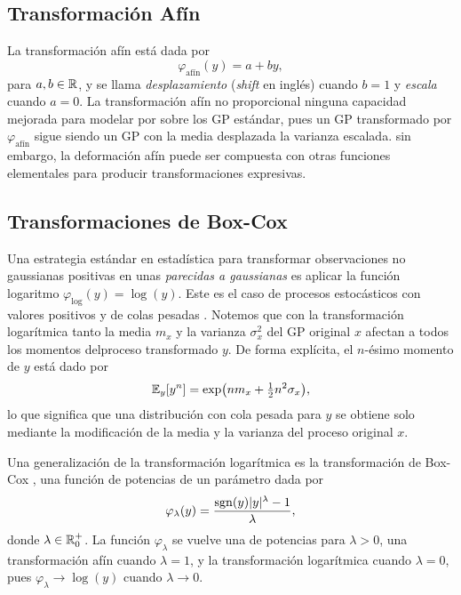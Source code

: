 \subsection{Transformación Afín}

La transformación afín está dada por
\begin{equation}
	\label{eq:affine-trans}
	\varphi_{\text{afín}}(y) = a + by,
\end{equation}
para \(a, b \in \mathbb{R}\), y se llama \emph{desplazamiento} (\emph{shift} en inglés) cuando \(b=1\) y \emph{escala} cuando \(a=0\). La transformación afín no proporcional ninguna capacidad mejorada para modelar por sobre los GP estándar, pues un GP transformado por \(\varphi_{\text{afín}}\) sigue siendo un GP con la media desplazada la varianza escalada. sin embargo, la deformación afín puede ser compuesta con otras funciones elementales para producir transformaciones expresivas.

\subsection{Transformaciones de Box-Cox}
\label{sec:BC_trans}
Una estrategia estándar en estadística para transformar observaciones no gaussianas positivas en unas \emph{parecidas a gaussianas} es aplicar la función logaritmo \(\varphi_{\log}(y) = \log(y)\). Este es el caso de procesos estocásticos con valores positivos y de colas pesadas \cite{aitchison1976lognormal}. Notemos que con la transformación logarítmica tanto la media \(m_x\) y la varianza \(\sigma_x^2\) del GP original \(x\) afectan a todos los momentos delproceso transformado \(y\). De forma explícita, el \(n\)-ésimo momento de \(y\) está dado por
\begin{equation}
	\mathbb{E}_{y}[y^{n}] = \exp \bigl(nm_{x} + \tfrac{1}{2}n^{2} \sigma_{x}\bigr),
\end{equation}
lo que significa que una distribución con cola pesada para \(y\) se obtiene solo mediante la modificación de la media y la varianza del proceso original \(x\).

Una generalización de la transformación logarítmica es la transformación de Box-Cox \cite{boxcox,sakia1992box}, una función de potencias de un parámetro dada por
\begin{equation}
	\label{eq:box-cox-trans}
	\varphi_{\lambda}(y) = \frac{\operatorname{sgn}(y) \lvert y \rvert^{\lambda} - 1}{\lambda},
\end{equation}
donde \(\lambda \in \mathbb{R}^{+}_{0}\). La función \(\varphi_{\lambda}\) se vuelve una de potencias para \(\lambda >0\), una transformación afín cuando \(\lambda = 1\), y la transformación logarítmica cuando \(\lambda = 0\), pues \(\varphi_{\lambda} \to \log(y)\) cuando \(\lambda \to 0\).

